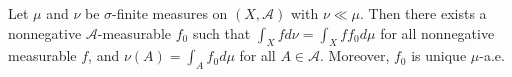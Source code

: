 Let $\mu$ and $\nu$ be $\sigma$-finite measures on $(X, \mathcal{A})$ with $\nu \ll \mu$. Then there exists a nonnegative $\mathcal{A}$-measurable $f_0$ such that $\int_X f d\nu = \int_X f f_0 d\mu$ for all nonnegative measurable $f$, and $\nu(A) = \int_A f_0 d\mu$ for all $A \in \mathcal{A}$. Moreover, $f_0$ is unique $\mu$-a.e.

